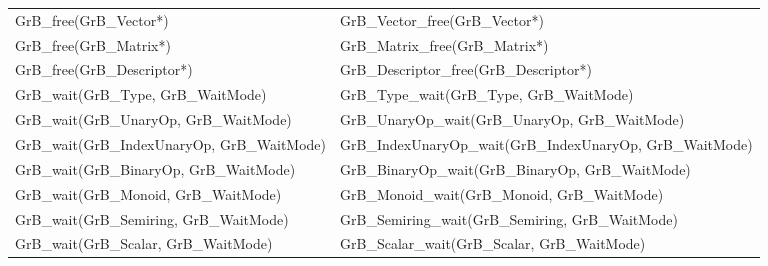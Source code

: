 \begin{table}[htb]
{\begin{tabular}{l|l}
{\sf GrB\_free(GrB\_Vector*)}					& {\sf GrB\_Vector\_free(GrB\_Vector*)} \\
{\sf GrB\_free(GrB\_Matrix*)}					& {\sf GrB\_Matrix\_free(GrB\_Matrix*)} \\
{\sf GrB\_free(GrB\_Descriptor*)}				& {\sf GrB\_Descriptor\_free(GrB\_Descriptor*)} \\ 
\hline
{\sf GrB\_wait(GrB\_Type, GrB\_WaitMode)}			& {\sf GrB\_Type\_wait(GrB\_Type, GrB\_WaitMode)} \\
{\sf GrB\_wait(GrB\_UnaryOp, GrB\_WaitMode)}			& {\sf GrB\_UnaryOp\_wait(GrB\_UnaryOp, GrB\_WaitMode)} \\
{\sf GrB\_wait(GrB\_IndexUnaryOp, GrB\_WaitMode)}		& {\sf GrB\_IndexUnaryOp\_wait(GrB\_IndexUnaryOp, GrB\_WaitMode)} \\
{\sf GrB\_wait(GrB\_BinaryOp, GrB\_WaitMode)}			& {\sf GrB\_BinaryOp\_wait(GrB\_BinaryOp, GrB\_WaitMode)} \\
{\sf GrB\_wait(GrB\_Monoid, GrB\_WaitMode)}			& {\sf GrB\_Monoid\_wait(GrB\_Monoid, GrB\_WaitMode)} \\
{\sf GrB\_wait(GrB\_Semiring, GrB\_WaitMode)}			& {\sf GrB\_Semiring\_wait(GrB\_Semiring, GrB\_WaitMode)} \\
{\sf GrB\_wait(GrB\_Scalar, GrB\_WaitMode)}			& {\sf GrB\_Scalar\_wait(GrB\_Scalar, GrB\_WaitMode)} \\


\end{tabular}}
\end{table}
